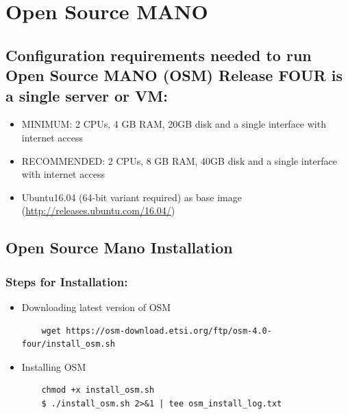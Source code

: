 \chapter{Open Source MANO}
\label{ch:osm}
\section{Configuration requirements needed to run Open Source MANO (OSM) Release FOUR is a single server or VM:}
		\begin{itemize}
	\item MINIMUM: 2 CPUs, 4 GB RAM, 20GB disk and a single interface with internet access
	\item RECOMMENDED: 2 CPUs, 8 GB RAM, 40GB disk and a single interface with internet access
	\item Ubuntu16.04 (64-bit variant required) as base image 
	(\hyperlink{name}{http://releases.ubuntu.com/16.04/})
		\end{itemize}
\section{Open Source Mano Installation}
\subsection{Steps for Installation:}
\begin{itemize}
	\item Downloading latest version of OSM
	\begin{lstlisting} 
	wget https://osm-download.etsi.org/ftp/osm-4.0-four/install_osm.sh
	\end{lstlisting}
	
	\item Installing OSM
	\begin{lstlisting} 
	chmod +x install_osm.sh
	$ ./install_osm.sh 2>&1 | tee osm_install_log.txt
\end{lstlisting}
\end{itemize}
